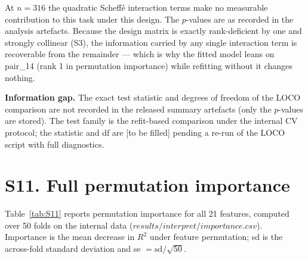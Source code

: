 \documentclass[utf8]{frontiers_suppmat}
\begin{document}
At $n = 316$ the quadratic Scheff\'e interaction terms make no measurable contribution to this task under this design. The $p$-values are as recorded in the analysis artefacts. Because the design matrix is exactly rank-deficient by one and strongly collinear (S3), the information carried by any single interaction term is recoverable from the remainder --- which is why the fitted model leans on pair\_14 (rank 1 in permutation importance) while refitting without it changes nothing.

\textbf{Information gap.} The exact test statistic and degrees of freedom of the LOCO comparison are not recorded in the released summary artefacts (only the $p$-values are stored). The test family is the refit-based comparison under the internal CV protocol; the statistic and df are {[}to be filled{]} pending a re-run of the LOCO script with full diagnostics.

\section{S11. Full permutation importance}

Table~\ref{tab:S11} reports permutation importance for all 21 features, computed over 50 folds on the internal data ($results/interpret/importance.csv$). Importance is the mean decrease in $R^2$ under feature permutation; sd is the across-fold standard deviation and se $= \text{sd} / \sqrt{50}$.
\end{document}
